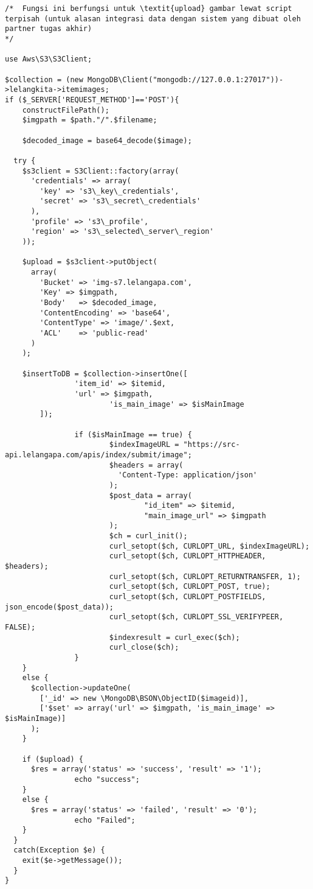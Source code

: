 \begin{lstlisting}[label=cdaws.03-01,style=php,caption=Kode Sumber \textit{Back-end} Upload Gambar Barang]
/*	Fungsi ini berfungsi untuk \textit{upload} gambar lewat script terpisah (untuk alasan integrasi data dengan sistem yang dibuat oleh partner tugas akhir)
*/

use Aws\S3\S3Client;

$collection = (new MongoDB\Client("mongodb://127.0.0.1:27017"))->lelangkita->itemimages;
if ($_SERVER['REQUEST_METHOD']=='POST'){
	constructFilePath();	
	$imgpath = $path."/".$filename;

	$decoded_image = base64_decode($image);

  try {
    $s3client = S3Client::factory(array(
      'credentials' => array(
        'key' => 's3\_key\_credentials',
        'secret' => 's3\_secret\_credentials'
      ),
      'profile' => 's3\_profile',
      'region' => 's3\_selected\_server\_region'
    ));

    $upload = $s3client->putObject(
      array(
        'Bucket' => 'img-s7.lelangapa.com',
        'Key' => $imgpath,
        'Body'   => $decoded_image,
        'ContentEncoding' => 'base64',
        'ContentType' => 'image/'.$ext,
        'ACL'    => 'public-read'
      )
    );

    $insertToDB = $collection->insertOne([
                'item_id' => $itemid,
                'url' => $imgpath,
                        'is_main_image' => $isMainImage
        ]);

                if ($isMainImage == true) {
                        $indexImageURL = "https://src-api.lelangapa.com/apis/index/submit/image";
                        $headers = array(
                          'Content-Type: application/json'
                        );
                        $post_data = array(
                                "id_item" => $itemid,
                                "main_image_url" => $imgpath
                        );
                        $ch = curl_init();
                        curl_setopt($ch, CURLOPT_URL, $indexImageURL);
                        curl_setopt($ch, CURLOPT_HTTPHEADER, $headers);
                        curl_setopt($ch, CURLOPT_RETURNTRANSFER, 1);
                        curl_setopt($ch, CURLOPT_POST, true);
                        curl_setopt($ch, CURLOPT_POSTFIELDS, json_encode($post_data));
                        curl_setopt($ch, CURLOPT_SSL_VERIFYPEER, FALSE);
                        $indexresult = curl_exec($ch);
                        curl_close($ch);
                }
    }
    else {
      $collection->updateOne(
        ['_id' => new \MongoDB\BSON\ObjectID($imageid)],
        ['$set' => array('url' => $imgpath, 'is_main_image' => $isMainImage)]
      );
    }

    if ($upload) {
      $res = array('status' => 'success', 'result' => '1');
                echo "success";
    }
    else {
      $res = array('status' => 'failed', 'result' => '0');
                echo "Failed";
    }
  }
  catch(Exception $e) {
    exit($e->getMessage());
  }
}


\end{lstlisting}
